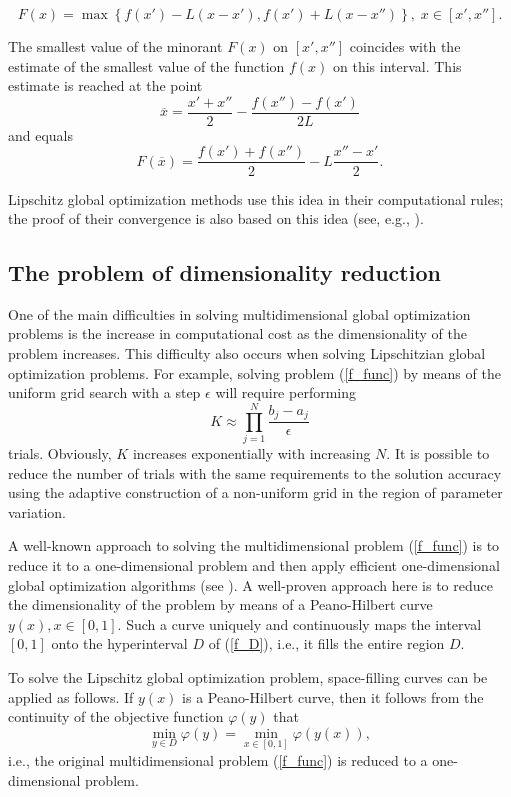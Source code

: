 \documentclass[preprint,12pt]{elsarticle}
\begin{document}
\[
F(x) = \max\left\{f(x') - L(x-x'),f(x') + L(x-x'')\right\}, \; x\in [x', x''].
\] 

The smallest value of the minorant $F(x)$ on $[x', x'']$ coincides with the estimate of the smallest value of the function $f(x)$ on this interval. This estimate is reached at the point
\[
\overline{x} = \frac{x'+x''}{2}-\frac{f(x'')-f(x')}{2L}
\] 
and equals
\[
F(\overline{x}) = \frac{f(x')+f(x'')}{2} -L \frac{x''-x'}{2}.
\]

Lipschitz global optimization methods use this idea in their computational rules; the proof of their convergence is also based on this idea (see, e.g.,
\cite{Jones2021,PaulaviciusZilinskas2014,Sergeyev2013,Evtushenko2013}).

\subsection{The problem of dimensionality reduction} 

One of the main difficulties in solving multidimensional global optimization problems is the increase in computational cost as the dimensionality of the problem increases. This difficulty also occurs when solving Lipschitzian global optimization problems. 
For example, solving problem (\ref{f_func}) by means of the uniform grid search with a step $\epsilon$ will require performing
\[
K \approx \prod_{j=1}^N{\frac{b_j-a_j}{\epsilon}}
\]
trials. Obviously, $K$ increases exponentially with increasing $N$. It is possible to reduce the number of trials with the same requirements to the solution accuracy using the adaptive construction of a non-uniform grid in the region of parameter variation. 


A well-known approach to solving the multidimensional problem (\ref{f_func}) is to reduce it to a one-dimensional problem and then apply efficient one-dimensional global optimization algorithms (see \cite{Strongin2000,Sergeyev2013}). A well-proven approach here is to reduce the dimensionality of the problem by means of a Peano-Hilbert curve $y(x), x \in [0, 1]$.  Such a curve uniquely and continuously maps the interval $[0, 1]$ onto the hyperinterval $D$ of (\ref{f_D}), i.e., it fills the entire region $D$.


To solve the Lipschitz global optimization problem, space-filling curves can be applied as follows. If $y(x)$ is a Peano-Hilbert curve, then it follows from the continuity of the objective function $\varphi(y)$ that
\[
\min_{y \in D } \varphi(y) = \min_{x \in [0,1] } \varphi(y(x)),
\]
i.e., the original multidimensional problem (\ref{f_func}) is reduced to a one-dimensional problem.
\end{document}
